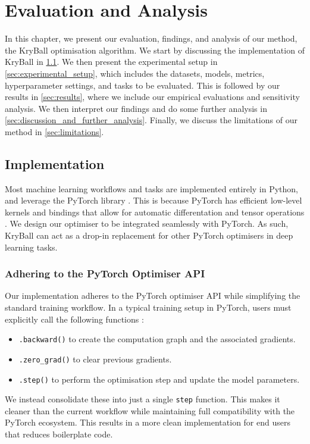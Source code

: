 \chapter{Evaluation and Analysis}
\label{chap:evaluation}

In this chapter, we present our evaluation, findings, and analysis of our method, the KryBall optimisation algorithm. We start by discussing the implementation of KryBall in \ref{sec:implementation}. We then present the experimental setup in \ref{sec:experimental_setup}, which includes the datasets, models, metrics, hyperparameter settings, and tasks to be evaluated. This is followed by our results in \ref{sec:results}, where we include our empirical evaluations and sensitivity analysis. We then interpret our findings and do some further analysis in \ref{sec:discussion_and_further_analysis}. Finally, we discuss the limitations of our method in \ref{sec:limitations}.

\section{Implementation}
\label{sec:implementation}

Most machine learning workflows and tasks are implemented entirely in Python, and leverage the PyTorch library \citep{pytorch}. This is because PyTorch has efficient low-level kernels and bindings that allow for automatic differentation and tensor operations \citep{pytorch}. We design our optimiser to be integrated seamlessly with PyTorch. As such, KryBall can act as a drop-in replacement for other PyTorch optimisers in deep learning tasks.

\subsection{Adhering to the PyTorch Optimiser API}
\label{ssec:adhering_to_the_pytorch_optimiser_api}

Our implementation adheres to the PyTorch optimiser API while simplifying the standard training workflow. In a typical training setup in PyTorch, users must explicitly call the following functions \citep{pytorch}:
\begin{itemize}
    \item \verb|.backward()| to create the computation graph and the associated gradients.
    \item \verb|.zero_grad()| to clear previous gradients.
    \item \verb|.step()| to perform the optimisation step and update the model parameters.
\end{itemize}
We instead consolidate these into just a single \verb|step| function. This makes it cleaner than the current workflow while maintaining full compatibility with the PyTorch ecosystem. This results in a more clean implementation for end users that reduces boilerplate code. 

